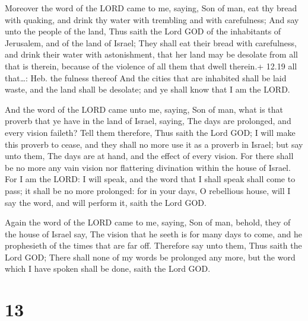  Moreover the word of the LORD came to me, saying,
 Son of man, eat thy bread with quaking, and drink thy
water with trembling and with carefulness;  And say unto
the people of the land, Thus saith the Lord GOD of the inhabitants of
Jerusalem, and of the land of Israel; They shall eat their bread with
carefulness, and drink their water with astonishment, that her land may
be desolate from all that is therein, because of the violence of all
them that dwell therein.+ 12.19 all that\ldots: Heb. the fulness thereof
 And the cities that are inhabited shall be laid waste, and
the land shall be desolate; and ye shall know that I am the LORD.

 And the word of the LORD came unto me, saying,
 Son of man, what is that proverb that ye have in the land
of Israel, saying, The days are prolonged, and every vision faileth?
 Tell them therefore, Thus saith the Lord GOD; I will make
this proverb to cease, and they shall no more use it as a proverb in
Israel; but say unto them, The days are at hand, and the effect of every
vision.  For there shall be no more any vain vision nor
flattering divination within the house of Israel.  For I am
the LORD: I will speak, and the word that I shall speak shall come to
pass; it shall be no more prolonged: for in your days, O rebellious
house, will I say the word, and will perform it, saith the Lord GOD.

 Again the word of the LORD came to me, saying,
 Son of man, behold, they of the house of Israel say, The
vision that he seeth is for many days to come, and he prophesieth of the
times that are far off.  Therefore say unto them, Thus
saith the Lord GOD; There shall none of my words be prolonged any more,
but the word which I have spoken shall be done, saith the Lord GOD.

\hypertarget{section-12}{%
\section{13}\label{section-12}}


